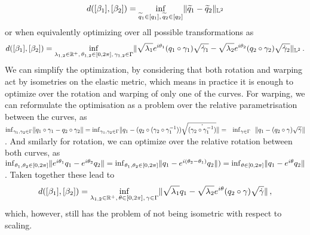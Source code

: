 $$d([\beta_1], [\beta_2]) = 
  \inf_{\widetilde q_1 \in [q_1],\,\widetilde q_2 \in [q_2]} \lVert \widetilde q_1 - \widetilde q_2 \rVert_{\mathbb{L}^2}$$
or when equivalently optimizing over all possible transformations as
$$d([\beta_1], [\beta_2]) = 
  \inf_{\lambda_{1,2} \in \mathbb{R}^+,\,\theta_{1,2} \in [0,2\pi],\, \gamma_{1,2} \in \Gamma} \lVert \sqrt{\lambda_1} e^{i\theta_1}(q_1 \circ \gamma_1) \sqrt{\dot\gamma_1} - \sqrt{\lambda_2} e^{i\theta_2}(q_2 \circ \gamma_2) \sqrt{\dot\gamma_2}\rVert_{\mathbb{L}^2}\,.$$
We can simplify the optimization, by considering that both rotation and warping act by isometries on the elastic metric, which means in practice it is enough to optimize over the rotation and warping of only one of the curves.
For warping, we can reformulate the optimisation as a problem over the relative parametrisation between the curves, as $\inf_{\gamma_1,\gamma_2 \in \Gamma} \lVert q_1 \circ \gamma_1 - q_2 \circ \gamma_2\rVert = \inf_{\gamma_1,\gamma_2 \in \Gamma} \lVert q_1 - (q_2 \circ (\gamma_2 \circ \gamma_1^{-1})) \sqrt{\dot{(\gamma_2 \circ \gamma_1^{-1})}}\rVert= \,\,\,\,\inf_{\gamma \in \Gamma} \,\,\,\, \lVert q_1 - (q_2 \circ \gamma) \sqrt{\dot\gamma}\rVert$.
And smilarly for rotation, we can optimize over the relative rotation between both curves, as
$\inf_{\theta_1,\theta_2 \in [0,2\pi]} \lVert e^{i\theta_1}q_1 - e^{i\theta_2}q_2\rVert = \inf_{\theta_1, \theta_2 \in [0,2\pi]} \lVert q_1 - e^{i(\theta_2 - \theta_1)}q_2\rVert ) = \inf_{\theta \in [0,2\pi]} \lVert q_1 - e^{i\theta}q_2\rVert$.
Taken together these lead to
$$d([\beta_1], [\beta_2]) = 
  \inf_{\lambda_{1,2} \in \mathbb{R}^+,\,\theta \in [0,2\pi],\, \gamma \in \Gamma} \lVert \sqrt{\lambda_1}q_1 - \sqrt{\lambda_2} e^{i\theta}(q_2 \circ \gamma) \sqrt{\dot\gamma}\rVert\,,$$
which, however, still has the problem of not being isometric with respect to scaling.


